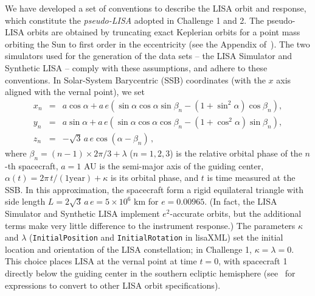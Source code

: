\documentclass[12pt]{iopart}
\begin{document}
We have developed a set of conventions to describe the LISA orbit and response, which constitute the \emph{pseudo-LISA} adopted in Challenge 1 and 2. The pseudo-LISA orbits are obtained by truncating exact Keplerian orbits for a point mass orbiting the Sun to first order in the eccentricity (see the Appendix of~\cite{lisasimulator}). The two simulators used for the generation of the data sets -- the LISA Simulator \cite{lisasimulator} and Synthetic LISA \cite{synthlisa} -- comply with these assumptions, and adhere to these conventions. In Solar-System Barycentric (SSB) coordinates (with the $x$ axis aligned with the vernal point), we set
%
\begin{eqnarray}
x_n &=& a\cos \alpha + a \, e\left(\sin\alpha\cos\alpha\sin\beta_n
-(1+\sin^2\alpha)\cos\beta_n\right), \nonumber \\
y_n &=& a\sin \alpha + a \, e\left(\sin\alpha\cos\alpha\cos\beta_n
-(1+\cos^2\alpha)\sin\beta_n\right), \\
z_n & = & -\sqrt{3} \, a \, e \cos(\alpha-\beta_n) \, , \nonumber
\end{eqnarray}
%
where $\beta_n = (n-1)\times2\pi/3 + \lambda$ ($n=1, 2, 3$) is the relative orbital phase of the $n$-th spacecraft, $a = 1$ AU is the semi-major axis of the guiding center, $\alpha(t)=2 \pi \, t / (1 \mathrm{year}) + \kappa$ is its orbital phase, and $t$ is time measured at the SSB. In this approximation, the spacecraft form a rigid equilateral triangle with side length $L = 2\sqrt{3} \, a \, e = 5\times 10^6$ km for $e=0.00965$. (In fact, the LISA Simulator and Synthetic LISA implement $e^2$-accurate orbits, but the additional terms make very little difference to the instrument response.) The parameters $\kappa$ and $\lambda$ (\texttt{InitialPosition} and \texttt{InitialRotation} in lisaXML) set the initial location and orientation of the LISA constellation; in Challenge 1, $\kappa=\lambda=0$. This choice places LISA at the vernal point at time $t=0$, with spacecraft 1 directly below the guiding center in the southern ecliptic hemisphere (see~\cite{MLDCdoc} for expressions to convert to other LISA orbit specifications). 
%
\end{document}
